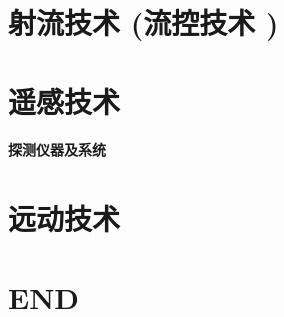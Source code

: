 \documentclass[UTF8]{../../ApplicationUniverse}
\begin{document}
\chapter{射流技术 (流控技术 )}
\chapter{遥感技术}
\subsubsection{探测仪器及系统}
\chapter{远动技术}





\chapter{END}
\end{document}
